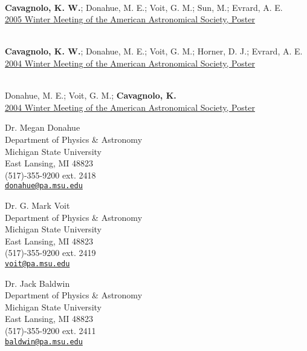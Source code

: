 \documentclass[11pt]{cv}
\begin{document}
\begin{llist}
{}\\
{\bf Cavagnolo, K. W.}; Donahue, M. E.; Voit, G. M.; Sun, M.; Evrard, A. E.\\
\href{http://adsabs.harvard.edu/abs/2005AAS...20713903C}{2005 Winter
Meeting of the American Astronomical Society, Poster}

{}\\
{\bf Cavagnolo, K. W.}; Donahue, M. E.; Voit, G. M.; Horner, D. J.; Evrard, A. E.\\
\href{http://adsabs.harvard.edu/abs/2004AAS...20514715C}{2004 Winter
Meeting of the American Astronomical Society, Poster}

{}\\
Donahue, M. E.; Voit, G. M.; {\bf Cavagnolo, K.}\\
\href{http://adsabs.harvard.edu/abs/2004AAS...205.6020D}{2004 Winter
Meeting of the American Astronomical Society, Poster}



{\sc Dr. Megan Donahue}\\
Department of Physics \& Astronomy\\
Michigan State University\\
East Lansing, MI 48823\\
(517)-355-9200 ext. 2418\\
\href{mailto:donahue@pa.msu.edu}{\tt donahue@pa.msu.edu}

{\sc Dr. G. Mark Voit}\\
Department of Physics \& Astronomy\\
Michigan State University\\
East Lansing, MI 48823\\
(517)-355-9200 ext. 2419\\
\href{mailto:voit@pa.msu.edu}{\tt voit@pa.msu.edu}

{\sc Dr. Jack Baldwin}\\
Department of Physics \& Astronomy\\
Michigan State University\\
East Lansing, MI 48823\\
(517)-355-9200 ext. 2411\\
\href{mailto:baldwin@pa.msu.edu}{\tt baldwin@pa.msu.edu}


\end{llist}
\end{document}
